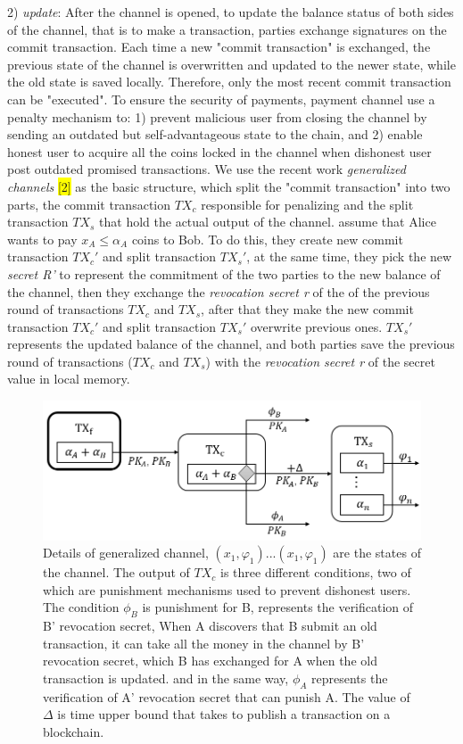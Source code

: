 \documentclass[conference]{IEEEtran}
\begin{document}
2) \emph{update}: After the channel is opened, to update the balance status of both sides of the channel, that is to make a transaction, 
parties exchange signatures on the commit transaction. Each time a new "commit transaction" is exchanged, the previous state of the channel 
is overwritten and updated to the newer state, while the old state is saved locally. Therefore, only the most recent commit transaction 
can be "executed". To ensure the security of payments, payment channel use a penalty mechanism to: 1) prevent malicious user from closing 
the channel by sending an outdated but self-advantageous state to the chain, and 2) enable honest user to acquire all the coins locked in the 
channel when dishonest user post outdated promised transactions. We use the recent work \emph{generalized channels} \colorbox{yellow}{[2]} 
as the basic structure, which split the "commit transaction" into two parts, the commit transaction $TX_c$ responsible for penalizing and 
the split transaction $TX_s$ that hold the actual output of the channel. assume that Alice wants to pay $x_A \leq \alpha_A$ coins to Bob. 
To do this, they create new commit transaction $TX_c'$ and split transaction $TX_s'$, at the same time, they pick the new \emph{secret R'} 
to represent the commitment of the two parties to the new balance of the channel, then they exchange the \emph{revocation secret r} of the 
of the previous round of transactions $TX_c$ and $TX_s$, after that they make the new commit transaction $TX_c'$ and split transaction $TX_s'$ 
overwrite previous ones. $TX_s'$ represents the updated balance of the channel, and both parties save the previous 
round of transactions ($TX_c$ and $TX_s$) with the \emph{revocation secret r} of the secret value in local memory.


\begin{figure}[t]
    \centering
    \includegraphics[scale=0.45]{fig3.png}
    \caption{Details of generalized channel, $(x_1,\varphi_1)...(x_1,\varphi_1)$ are the states of the channel. The output of $TX_c$ 
    is three different conditions, two of which are punishment mechanisms used to prevent dishonest users. The condition $\phi_B$ is
    punishment for B, represents the verification of B’ revocation secret, When A discovers that B submit an old transaction, it can 
    take all the money in the channel by B' revocation secret, which B has exchanged for A when the old transaction is updated.
    and in the same way, $\phi_A$ represents the verification of A’ revocation secret that can punish A. The value of $\Delta$ is time upper 
    bound that takes to publish a transaction on a blockchain.
     }
\end{figure}
\end{document}
